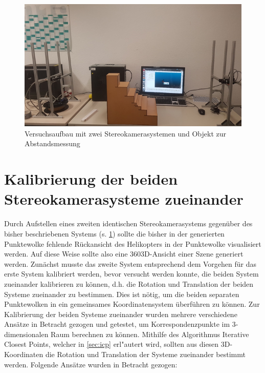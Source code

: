 \begin{figure}[H]
	\includegraphics[scale=1.0]{bilder/abstandsmessung}
	\caption[Versuchsaufbau mit zwei Stereokamerasystemen und Objekt zur Abstandsmessung]{Versuchsaufbau mit zwei Stereokamerasystemen und Objekt zur Abstandsmessung}
	\label{fig:abstandsmessung}
\end{figure}

\section{Kalibrierung der beiden Stereokamerasysteme zueinander}
\label{sec:kalibbeide}

Durch Aufstellen eines zweiten identischen Stereokamerasystems gegenüber des bisher beschriebenen Systems (s. \ref{fig:abstandsmessung}) sollte die bisher in der generierten Punktewolke fehlende Rückansicht des Helikopters in der Punktewolke visualisiert werden. Auf diese Weise sollte also eine 360\degree \space 3D-Ansicht einer Szene generiert werden. Zunächst musste das zweite System entsprechend dem Vorgehen für das erste System kalibriert werden, bevor versucht werden konnte, die beiden System zueinander kalibrieren zu können, d.h. die Rotation und Translation der beiden Systeme zueinander zu bestimmen. Dies ist nötig, um die beiden separaten Punktewolken in ein gemeinsames Koordinatensystem überführen zu können.\newline
\noindent Zur Kalibrierung der beiden Systeme zueinander wurden mehrere verschiedene Ansätze in Betracht gezogen und getestet, um Korrespondenzpunkte im 3-dimensionalen Raum berechnen zu können. Mithilfe des Algorithmus Iterative Closest Points, welcher in \ref{sec:icp} erl"autert wird, sollten aus diesen 3D-Koordinaten die Rotation und Translation der Systeme zueinander bestimmt werden.\newline
\noindent Folgende Ansätze wurden in Betracht gezogen:


